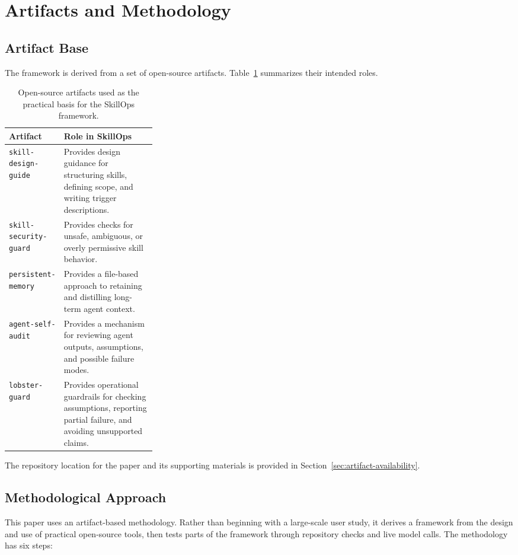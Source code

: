 \documentclass[11pt]{article}
\begin{document}
\section{Artifacts and Methodology}

\subsection{Artifact Base}

The framework is derived from a set of open-source artifacts.
Table~\ref{tab:artifacts} summarizes their intended roles.

\begin{table}[t]
\centering
\footnotesize
\begin{tabularx}{\linewidth}{
    >{\raggedright\arraybackslash}p{0.29\linewidth}
    >{\raggedright\arraybackslash}X
}
\toprule
\textbf{Artifact} & \textbf{Role in SkillOps} \\
\midrule
\texttt{skill-design-guide} & Provides design guidance for structuring skills,
defining scope, and writing trigger descriptions. \\
\texttt{skill-security-guard} & Provides checks for unsafe, ambiguous, or
overly permissive skill behavior. \\
\texttt{persistent-memory} & Provides a file-based approach to retaining and
distilling long-term agent context. \\
\texttt{agent-self-audit} & Provides a mechanism for reviewing agent outputs,
assumptions, and possible failure modes. \\
\texttt{lobster-guard} & Provides operational guardrails for checking
assumptions, reporting partial failure, and avoiding unsupported claims. \\
\bottomrule
\end{tabularx}
\caption{Open-source artifacts used as the practical basis for the SkillOps
framework.}
\label{tab:artifacts}
\end{table}

The repository location for the paper and its supporting materials is provided
in Section~\ref{sec:artifact-availability}.

\subsection{Methodological Approach}

This paper uses an artifact-based methodology. Rather than beginning with a
large-scale user study, it derives a framework from the design and use of
practical open-source tools, then tests parts of the framework through
repository checks and live model calls. The methodology has six steps:
\end{document}
